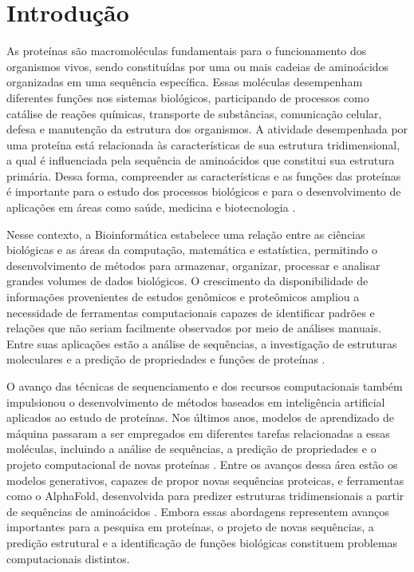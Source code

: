 
\section{Introdução}
\label{sec:introducao}

As proteínas são macromoléculas fundamentais para o funcionamento dos organismos vivos, sendo constituídas por uma ou mais cadeias de aminoácidos organizadas em uma sequência específica. Essas moléculas desempenham diferentes funções nos sistemas biológicos, participando de processos como catálise de reações químicas, transporte de substâncias, comunicação celular, defesa e manutenção da estrutura dos organismos. A atividade desempenhada por uma proteína está relacionada às características de sua estrutura tridimensional, a qual é influenciada pela sequência de aminoácidos que constitui sua estrutura primária. Dessa forma, compreender as características e as funções das proteínas é importante para o estudo dos processos biológicos e para o desenvolvimento de aplicações em áreas como saúde, medicina e biotecnologia \cite{alberts2002,lin2024}.

Nesse contexto, a Bioinformática estabelece uma relação entre as ciências biológicas e as áreas da computação, matemática e estatística, permitindo o desenvolvimento de métodos para armazenar, organizar, processar e analisar grandes volumes de dados biológicos. O crescimento da disponibilidade de informações provenientes de estudos genômicos e proteômicos ampliou a necessidade de ferramentas computacionais capazes de identificar padrões e relações que não seriam facilmente observados por meio de análises manuais. Entre suas aplicações estão a análise de sequências, a investigação de estruturas moleculares e a predição de propriedades e funções de proteínas \cite{luscombe2001}.

O avanço das técnicas de sequenciamento e dos recursos computacionais também impulsionou o desenvolvimento de métodos baseados em inteligência artificial aplicados ao estudo de proteínas. Nos últimos anos, modelos de aprendizado de máquina passaram a ser empregados em diferentes tarefas relacionadas a essas moléculas, incluindo a análise de sequências, a predição de propriedades e o projeto computacional de novas proteínas \cite{bonetta2020,notin2024}. Entre os avanços dessa área estão os modelos generativos, capazes de propor novas sequências proteicas, e ferramentas como o AlphaFold, desenvolvida para predizer estruturas tridimensionais a partir de sequências de aminoácidos \cite{jumper2021,notin2024}. Embora essas abordagens representem avanços importantes para a pesquisa em proteínas, o projeto de novas sequências, a predição estrutural e a identificação de funções biológicas constituem problemas computacionais distintos.

